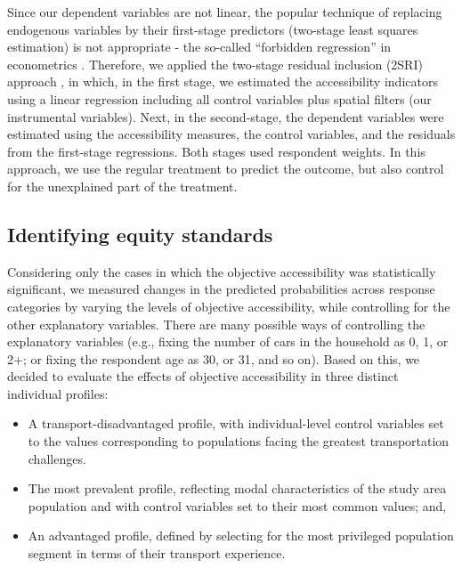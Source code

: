 \documentclass[preprint, 3p,
authoryear]{elsarticle} %
\begin{document}
Since our dependent variables are not linear, the popular technique of
replacing endogenous variables by their first-stage predictors
(two-stage least squares estimation) is not appropriate - the so-called
``forbidden regression'' in econometrics
\citep{wooldridge2010, cunningham2021causal, huntington-klein2021}.
Therefore, we applied the two-stage residual inclusion (2SRI) approach
\citep{terza2008}, in which, in the first stage, we estimated the
accessibility indicators using a linear regression including all control
variables plus spatial filters (our instrumental variables). Next, in
the second-stage, the dependent variables were estimated using the
accessibility measures, the control variables, and the residuals from
the first-stage regressions. Both stages used respondent weights. In
this approach, we use the regular treatment to predict the outcome, but
also control for the unexplained part of the treatment.

\subsection{Identifying equity
standards}\label{identifying-equity-standards}

Considering only the cases in which the objective accessibility was
statistically significant, we measured changes in the predicted
probabilities across response categories by varying the levels of
objective accessibility, while controlling for the other explanatory
variables. There are many possible ways of controlling the explanatory
variables (e.g., fixing the number of cars in the household as 0, 1, or
2+; or fixing the respondent age as 30, or 31, and so on). Based on
this, we decided to evaluate the effects of objective accessibility in
three distinct individual profiles:

\begin{itemize}
\item
  A transport-disadvantaged profile, with individual-level control
  variables set to the values corresponding to populations facing the
  greatest transportation challenges.
\item
  The most prevalent profile, reflecting modal characteristics of the
  study area population and with control variables set to their most
  common values; and,
\item
  An advantaged profile, defined by selecting for the most privileged
  population segment in terms of their transport experience.
\end{itemize}
\end{document}
